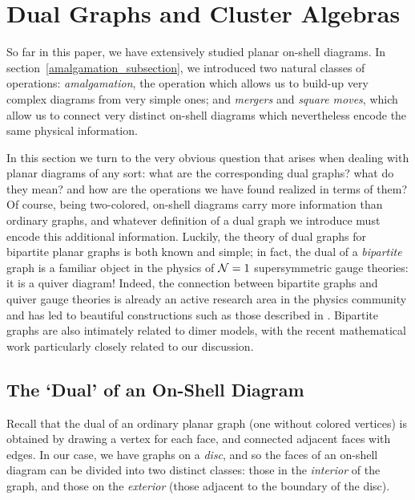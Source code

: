\documentclass[12pt,hyperref,compress]{JHEP3}
\begin{document}
\newpage

\newtheorem{definition}{Definition}[section]

\section{Dual Graphs and Cluster Algebras}\label{cluster_coordinates_section}

So far in this paper, we have extensively studied planar on-shell diagrams. In \mbox{section \ref{amalgamation_subsection}}, we introduced two natural classes of operations: {\it amalgamation}, the operation which allows us to build-up very complex diagrams from very simple ones; and {\it mergers} and {\it square moves}, which allow us to connect very distinct on-shell diagrams which nevertheless encode the same physical information.

In this section we turn to the very obvious question that arises when dealing with planar diagrams of any sort: what are the corresponding dual graphs? what do they mean? and how are the operations we have found realized in terms of them?
Of course, being two-colored, on-shell diagrams carry more information than ordinary graphs, and whatever definition of a dual graph we introduce must encode this additional information. Luckily, the theory of dual graphs for bipartite planar graphs is both known and simple; in fact, the dual of a {\it bipartite} graph is a familiar object in the physics of ${\cal N}=1$ supersymmetric gauge theories: it is a quiver diagram! Indeed, the connection between bipartite graphs and quiver gauge theories is already an active research area in the physics community and has led to beautiful constructions such as those described in \cite{Xie:2012dw,Franco:2012mm,Xie:2012mr,Xie:2012jd,Heckman:2012jh,Franco:2012wv}. Bipartite graphs are also intimately related to dimer models, with the recent mathematical work \cite{GK} particularly closely related to our discussion.

\subsection{The `Dual' of an On-Shell Diagram}

Recall that the dual of an ordinary planar graph (one without colored vertices) is obtained by drawing a vertex for each face, and connected adjacent faces with edges. In our case, we have graphs on a {\it disc}, and so the faces of an on-shell diagram can be divided into two distinct classes: those in the {\it interior} of the graph, and those on the {\it exterior} (those adjacent to  the boundary of the disc).
\end{document}

